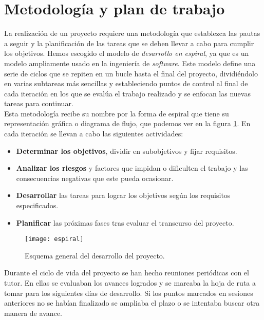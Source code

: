 \section{Metodología y plan de trabajo}

La realización de un proyecto requiere una metodología que establezca las pautas a seguir y la planificación de las tareas que se deben llevar a cabo para cumplir los objetivos. Hemos escogido el modelo de \emph{desarrollo en espiral}, ya que es un modelo ampliamente usado en la ingeniería de \emph{software}. Este modelo define una serie de ciclos que se repiten en un bucle hasta el final del proyecto, dividiéndolo en varias subtareas más sencillas y estableciendo puntos de control al final de cada iteración en los que se evalúa el trabajo realizado y se enfocan las nuevas tareas para continuar.\\

Esta metodología recibe su nombre por la forma de espiral que tiene su representación gráfica o diagrama de flujo, que podemos ver en la figura \ref{fig:planificacion_espiral}. En cada iteración se llevan a cabo las siguientes actividades:

\begin{itemize}
 \item \textbf{Determinar los objetivos}, dividir en subobjetivos y fijar requisitos.
 \item \textbf{Analizar los riesgos} y factores que impidan o dificulten el trabajo y las consecuencias negativas que este
 pueda ocasionar.
 \item \textbf{Desarrollar} las tareas para lograr los objetivos según los requisitos especificados.
 \item \textbf{Planificar} las próximas fases tras evaluar el transcurso del proyecto.
\end{itemize}

\begin{figure}[h!]
\centering
\texttt{[image: espiral]}
\caption{Esquema general del desarrollo del proyecto.}
\label{fig:planificacion_espiral}
\end{figure}

Durante el ciclo de vida del proyecto se han hecho reuniones periódicas con el tutor. En ellas se evaluaban los avances logrados y se marcaba la hoja de ruta a tomar para los siguientes días de desarrollo. Si los puntos marcados en sesiones anteriores no se habían finalizado se ampliaba el plazo o se intentaba buscar otra manera de avance.\\

